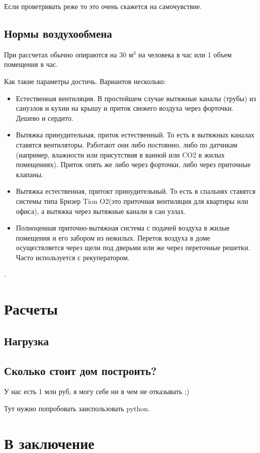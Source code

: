 \documentclass[12pt, twocolumn]{report}
\begin{document}
Если проветривать реже то это очень скажется на самочувствие.  

\chapter{Нормы воздухообмена}

При рассчетах обычно опираются на 30 $\text{м}^3$ на человека в час или 1 объем помещения в час.

Как такие параметры достичь. Вариантов несколько:

\begin{itemize}
	\item Естественная вентиляция. В простейшем случае вытяжные каналы (трубы) из санузлов и кухни на крышу и приток свежего воздуха через форточки. Дешево и сердито.
	\item  Вытяжка принудительная, приток естественный. То есть в вытяжных каналах ставятся вентиляторы. Работают они либо постоянно, либо по датчикам (например, влажности или присутствия в ванной или CO2 в жилых помещениях). Приток опять же либо через форточки, либо через приточные клапаны.
	\item Вытяжка естественная, притокт принудительный.
	То есть в спальнях ставятся системы типа Бризер Tion O2(это приточная вентиляция для квартиры или офиса), а вытяжка через вытяжные канали в сан узлах.
	\item Полноценная приточно-вытяжная система с подачей воздуха в жилые помещения и его забором из нежилых. Переток воздуха в доме осуществляется через щели под дверьми или же через переточные решетки. Часто используется с рекуператором.
\end{itemize}. 


\part{Расчеты}
\chapter{Нагрузка}

\chapter{Сколько стоит дом построить?}
У нас есть 1 млн руб, я могу себе ни в чем не отказывать ;)

Тут нужно попробовать заиспользовать python.



\part{В заключение}
\end{document}
